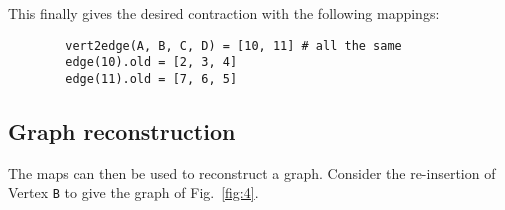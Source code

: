     This finally gives the desired contraction with the following mappings:
    \begin{lstlisting}
        vert2edge(A, B, C, D) = [10, 11] # all the same
        edge(10).old = [2, 3, 4]
        edge(11).old = [7, 6, 5]
    \end{lstlisting}


    

    \vspace{12pt}\subsection{Graph reconstruction}

    \noindent The maps can then be used to reconstruct a graph. Consider the re-insertion of Vertex {\tt B} to give the graph of
    Fig.~\ref{fig:4}.
    
    

